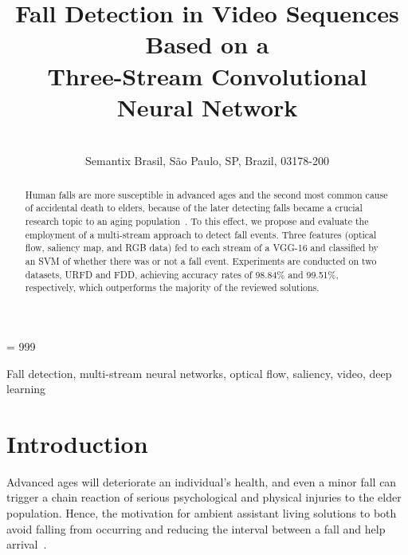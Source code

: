 \documentclass[10pt, conference, compsocconf]{IEEEtran}
\begin{document}
\sloppy
\tolerance = 999

\title{Fall Detection in Video Sequences Based on a \\ Three-Stream Convolutional Neural Network}

\author{
   \\
    Semantix Brasil, S\~ao Paulo, SP, Brazil, 03178-200
}

\maketitle

\begin{abstract}
Human falls are more susceptible in advanced ages and the second most common cause of accidental death to elders, because of the later detecting falls became a crucial research topic to an aging population~\cite{who2007report}. To this effect, we propose and evaluate the employment of a multi-stream approach to detect fall events. Three features (optical flow, saliency map, and RGB data) fed to each stream of a VGG-16 and classified by an SVM of whether there was or not a fall event. Experiments are conducted on two datasets, URFD and FDD, achieving accuracy rates of 98.84\% and 99.51\%, respectively, which outperforms the majority of the reviewed solutions.
\end{abstract}

\begin{IEEEkeywords}
Fall detection, multi-stream neural networks, optical flow, saliency, video, deep learning
\end{IEEEkeywords}

\section{Introduction}

Advanced ages will deteriorate an individual's health, and even a minor fall can trigger a chain reaction of serious psychological and physical injuries to the elder population. Hence, the motivation for ambient assistant living solutions to both avoid falling from occurring and reducing the interval between a fall and help arrival~\cite{carneiro2019multi,carneiro2019deep}.
\end{document}
